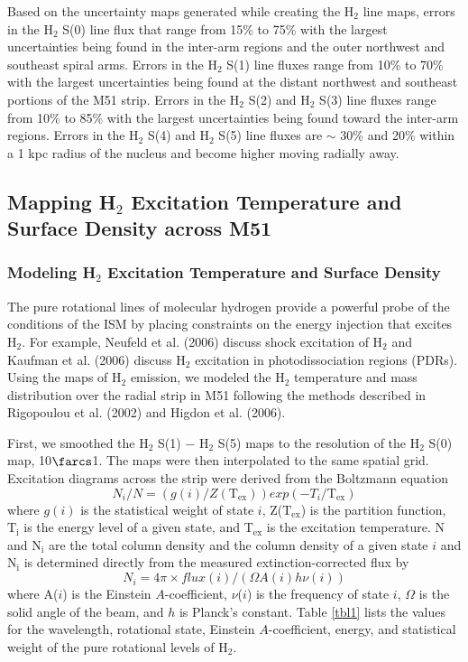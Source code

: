 \documentclass[12pt,preprint]{aastex}
\begin{document}
Based on the uncertainty maps generated while creating the H$_2$ line maps, 
errors in the H$_2$ S(0) line flux that range from 15\% to 75\% with the 
largest uncertainties being found in the inter-arm regions and the outer 
northwest and southeast spiral arms.  Errors in the H$_2$ S(1) line 
fluxes range from 10\% to 70\% with the largest uncertainties being 
found at the distant northwest and southeast portions of the M51 strip.  
Errors in the H$_2$ S(2) and H$_2$ S(3) line fluxes range from 10\% 
to 85\% with the largest uncertainties being found toward the inter-arm 
regions.  Errors in the H$_2$ S(4) and H$_2$ S(5) line fluxes are 
$\sim$ 30\% and 20\% within a 1 kpc radius of the nucleus and become higher 
moving radially away. 

\subsection{Mapping H$_2$ Excitation Temperature and Surface Density across M51}

\subsubsection{Modeling H$_2$ Excitation Temperature and Surface Density}

The pure rotational lines of molecular hydrogen provide a powerful
probe of the conditions of the ISM by placing constraints on the
energy injection that excites H$_2$.  For example, 
Neufeld et al. (2006) discuss shock excitation of H$_2$ and 
Kaufman et al. (2006) discuss H$_2$ excitation in photodissociation regions (PDRs).  
Using the maps of H$_2$ emission, we modeled the H$_2$ 
temperature and mass distribution over the radial strip in M51 
following the methods described in Rigopoulou et al. (2002) 
and Higdon et al. (2006).

First, we smoothed the H$_2$ S(1) $-$ H$_2$ S(5)
maps to the resolution of the H$_2$ S(0) map, 10$\farcs$1.
The maps were then interpolated to the same spatial grid.  Excitation
diagrams across the strip were derived from the Boltzmann equation
\begin{equation}
N_i/N = (g(i)/Z(\mathrm{T_{ex}}))exp(-T_i/\mathrm{T_{ex}})
\end{equation}
where $g(i)$ is the statistical weight of state $i$,
Z($\mathrm{T_{ex}}$) is the partition function, $\mathrm{T_i}$ is the
energy level of a given state, and $\mathrm{T_{ex}}$ is the excitation
temperature.  N and $\mathrm{N_i}$ are the total column density and
the column density of a given state $i$ and $\mathrm{N_i}$ is
determined directly from the measured extinction-corrected flux by
\begin{equation}
N_i = 4 \pi \times flux(i)/(\Omega A(i)h\nu (i))
\end{equation}
where A($i$) is the Einstein $A$-coefficient, $\nu$($i$) is the
frequency of state $i$, $\Omega$ is the solid angle of the beam, and
$h$ is Planck's constant.  Table \ref{tbl1} lists the values for the
wavelength, rotational state, Einstein $A$-coefficient, energy, and
statistical weight of the pure rotational levels of H$_2$.
\end{document}

